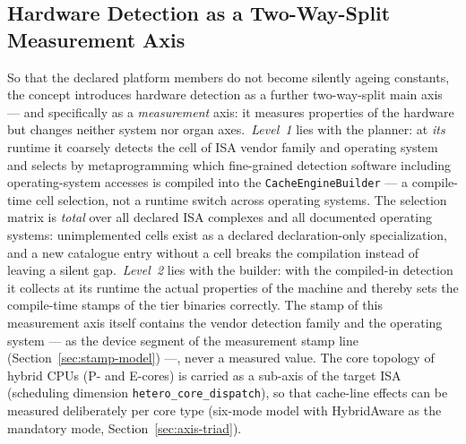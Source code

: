 \begin{nurlang}
\subsection{Hardware Detection as a Two-Way-Split Measurement Axis}\label{sec:hw-probe}
So that the declared platform members do not become silently ageing constants, the
concept introduces hardware detection as a further two-way-split main axis --- and specifically as a
\emph{measurement} axis: it measures properties of the hardware but changes neither system nor
organ axes.\ \emph{Level~1} lies with the planner: at \emph{its} runtime it coarsely detects the cell
of ISA vendor family and operating system and selects by metaprogramming which
fine-grained detection software including operating-system accesses is compiled into the \texttt{CacheEngineBuilder}
--- a compile-time cell selection, not a runtime switch across
operating systems. The selection matrix is \emph{total} over all declared ISA complexes and all
documented operating systems: unimplemented cells exist as a declared
declaration-only specialization, and a new catalogue entry without a cell breaks the compilation
instead of leaving a silent gap.\ \emph{Level~2} lies with the builder: with the compiled-in
detection it collects at its runtime the actual properties of the machine and thereby sets the
compile-time stamps of the tier binaries correctly. The stamp of this measurement axis itself contains the
vendor detection family and the operating system --- as the device segment of the measurement stamp line
(Section~\ref{sec:stamp-model}) ---, never a measured value. The core topology of hybrid CPUs (P- and
E-cores) is carried as a sub-axis of the target ISA (scheduling dimension \texttt{hetero\_core\_dispatch}),
so that cache-line effects can be measured deliberately per core type (six-mode model with
HybridAware as the mandatory mode, Section~\ref{sec:axis-triad}).


\end{nurlang}

